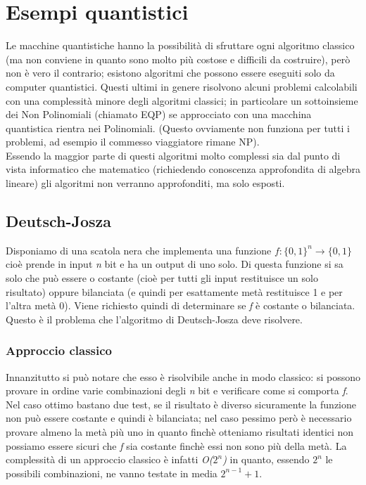 \section{Esempi quantistici}
Le macchine quantistiche hanno la possibilità di sfruttare ogni algoritmo classico (ma non conviene in quanto sono molto più costose e difficili da costruire), però non è vero il contrario; esistono algoritmi che possono essere eseguiti solo da computer quantistici.
Questi ultimi in genere risolvono alcuni problemi calcolabili con una complessità minore degli algoritmi classici; in particolare un sottoinsieme dei Non Polinomiali (chiamato EQP) se approcciato con una macchina quantistica rientra nei Polinomiali. (Questo ovviamente non funziona per tutti i problemi, ad esempio il commesso viaggiatore rimane NP).\\
Essendo la maggior parte di questi algoritmi molto complessi sia dal punto di vista informatico che matematico (richiedendo conoscenza approfondita di algebra lineare) gli algoritmi non verranno approfonditi, ma solo esposti.
\subsection{Deutsch-Josza}
Disponiamo di una scatola nera che implementa una funzione \textit{$f: \{0,1\}^n \rightarrow \{0,1\}$} cioè prende in input \textit{n} bit e ha un output di uno solo. Di questa funzione si sa solo che può essere o costante (cioè per tutti gli input restituisce un solo risultato) oppure bilanciata (e quindi per esattamente metà restituisce 1 e per l'altra metà 0). Viene richiesto quindi di determinare se \textit{f} è costante o bilanciata.
Questo è il problema che l'algoritmo di Deutsch-Josza deve risolvere.
\subsubsection{Approccio classico}
Innanzitutto si può notare che esso è risolvibile anche in modo classico: si possono provare in ordine varie combinazioni degli \textit{n} bit e verificare come si comporta \textit{f}. Nel caso ottimo bastano due test, se il risultato è diverso sicuramente la funzione non può essere costante e quindi è bilanciata; nel caso pessimo però è necessario provare almeno la metà più uno in quanto finchè otteniamo risultati identici non possiamo essere sicuri che \textit{f} sia costante finchè essi non sono più della metà. La complessità di un approccio classico è infatti \textit{O($2^n$)} in quanto, essendo $2^n$ le possibili combinazioni, ne vanno testate in media $2^{n-1} + 1$.
